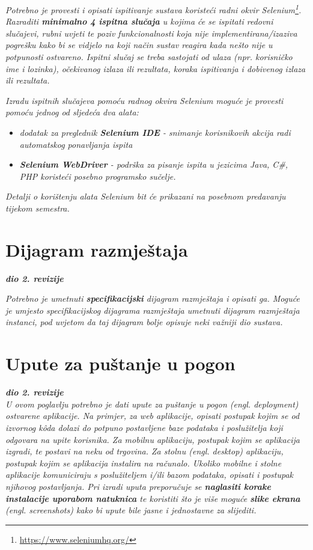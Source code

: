 			 \textit{Potrebno je provesti i opisati ispitivanje sustava koristeći radni okvir Selenium\footnote{\url{https://www.seleniumhq.org/}}. Razraditi \textbf{minimalno 4 ispitna slučaja} u kojima će se ispitati redovni slučajevi, rubni uvjeti te poziv funkcionalnosti koja nije implementirana/izaziva pogrešku kako bi se vidjelo na koji način sustav reagira kada nešto nije u potpunosti ostvareno. Ispitni slučaj se treba sastojati od ulaza (npr. korisničko ime i lozinka), očekivanog izlaza ili rezultata, koraka ispitivanja i dobivenog izlaza ili rezultata.\\ }
			 
			 \textit{Izradu ispitnih slučajeva pomoću radnog okvira Selenium moguće je provesti pomoću jednog od sljedeća dva alata:}
			 \begin{itemize}
			 	\item \textit{dodatak za preglednik \textbf{Selenium IDE} - snimanje korisnikovih akcija radi automatskog ponavljanja ispita	}
			 	\item \textit{\textbf{Selenium WebDriver} - podrška za pisanje ispita u jezicima Java, C\#, PHP koristeći posebno programsko sučelje.}
			 \end{itemize}
		 	\textit{Detalji o korištenju alata Selenium bit će prikazani na posebnom predavanju tijekom semestra.}
			
			\eject 
		
		
		\section{Dijagram razmještaja}
			
			\textbf{\textit{dio 2. revizije}}
			
			 \textit{Potrebno je umetnuti \textbf{specifikacijski} dijagram razmještaja i opisati ga. Moguće je umjesto specifikacijskog dijagrama razmještaja umetnuti dijagram razmještaja instanci, pod uvjetom da taj dijagram bolje opisuje neki važniji dio sustava.}
			
			\eject 
		
		\section{Upute za puštanje u pogon}
		
			\textbf{\textit{dio 2. revizije}}\\
		
			 \textit{U ovom poglavlju potrebno je dati upute za puštanje u pogon (engl. deployment) ostvarene aplikacije. Na primjer, za web aplikacije, opisati postupak kojim se od izvornog kôda dolazi do potpuno postavljene baze podataka i poslužitelja koji odgovara na upite korisnika. Za mobilnu aplikaciju, postupak kojim se aplikacija izgradi, te postavi na neku od trgovina. Za stolnu (engl. desktop) aplikaciju, postupak kojim se aplikacija instalira na računalo. Ukoliko mobilne i stolne aplikacije komuniciraju s poslužiteljem i/ili bazom podataka, opisati i postupak njihovog postavljanja. Pri izradi uputa preporučuje se \textbf{naglasiti korake instalacije uporabom natuknica} te koristiti što je više moguće \textbf{slike ekrana} (engl. screenshots) kako bi upute bile jasne i jednostavne za slijediti.}
			
